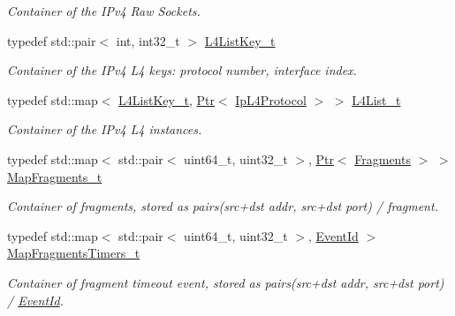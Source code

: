 \begin{DoxyCompactItemize}
\begin{DoxyCompactList}\small\item\em Container of the I\+Pv4 Raw Sockets. \end{DoxyCompactList}\item 
typedef std\+::pair$<$ int, int32\+\_\+t $>$ \hyperlink{classns3_1_1Ipv4L3Protocol_af8c2f6a17623a26e68c785ab1676d91c}{L4\+List\+Key\+\_\+t}
\begin{DoxyCompactList}\small\item\em Container of the I\+Pv4 L4 keys\+: protocol number, interface index. \end{DoxyCompactList}\item 
typedef std\+::map$<$ \hyperlink{classns3_1_1Ipv4L3Protocol_af8c2f6a17623a26e68c785ab1676d91c}{L4\+List\+Key\+\_\+t}, \hyperlink{classns3_1_1Ptr}{Ptr}$<$ \hyperlink{classns3_1_1IpL4Protocol}{Ip\+L4\+Protocol} $>$ $>$ \hyperlink{classns3_1_1Ipv4L3Protocol_aca93327d3f9e0fdce61d3e72927bd018}{L4\+List\+\_\+t}
\begin{DoxyCompactList}\small\item\em Container of the I\+Pv4 L4 instances. \end{DoxyCompactList}\item 
typedef std\+::map$<$ std\+::pair$<$ uint64\+\_\+t, uint32\+\_\+t $>$, \hyperlink{classns3_1_1Ptr}{Ptr}$<$ \hyperlink{classns3_1_1Ipv4L3Protocol_1_1Fragments}{Fragments} $>$ $>$ \hyperlink{classns3_1_1Ipv4L3Protocol_ac2b81caa9436d6a015bbbb68b6282481}{Map\+Fragments\+\_\+t}
\begin{DoxyCompactList}\small\item\em Container of fragments, stored as pairs(src+dst addr, src+dst port) / fragment. \end{DoxyCompactList}\item 
typedef std\+::map$<$ std\+::pair$<$ uint64\+\_\+t, uint32\+\_\+t $>$, \hyperlink{classns3_1_1EventId}{Event\+Id} $>$ \hyperlink{classns3_1_1Ipv4L3Protocol_acce90cf84f9acda8706768a1c266bfc8}{Map\+Fragments\+Timers\+\_\+t}
\begin{DoxyCompactList}\small\item\em Container of fragment timeout event, stored as pairs(src+dst addr, src+dst port) / \hyperlink{classns3_1_1EventId}{Event\+Id}. \end{DoxyCompactList}\end{DoxyCompactItemize}
